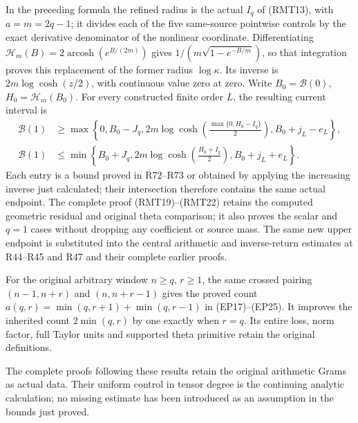 In the preceding formula the refined radius is the actual
\(I_q\) of (RMT13), with \(a=m=2q-1\); it divides each
of the five same-source pointwise controls by the exact
derivative denominator of the nonlinear coordinate.
Differentiating
\(\mathscr H_m(B)=2\operatorname{arcosh}(e^{B/(2m)})\)
gives \(1/(m\sqrt{1-e^{-B/m}})\), so that integration
proves this replacement of the former radius
\(\log\kappa\).  Its inverse is
\(2m\log\cosh(z/2)\), with continuous value zero at zero.
Write \(B_0=\mathcal B(0)\), \(H_0=\mathscr H_m(B_0)\).
For every constructed finite order \(L\), the resulting
current interval is
\[
 \begin{split}
 \mathcal B(1)&\geq
 \max\left\{0,B_0-J_q,
   2m\log\cosh\left(\frac{\max\{0,H_0-I_q\}}2\right),
   B_0+j_L-e_L\right\},\\
 \mathcal B(1)&\leq
 \min\left\{B_0+J_q,
   2m\log\cosh\left(\frac{H_0+I_q}2\right),
   B_0+j_L+e_L\right\}.
 \end{split}
\]
Each entry is a bound proved in R72--R73 or obtained
by applying the increasing inverse just calculated;
their intersection therefore contains the same actual
endpoint.  The complete proof (RMT19)--(RMT22) retains
the computed geometric residual and original theta
comparison; it also proves the scalar and \(q=1\)
cases without dropping any coefficient or source mass.
The same new upper endpoint is substituted into the
central arithmetic and inverse-return estimates at
R44--R45 and R47 and their complete earlier proofs.

For the original arbitrary window $n\ge q$, $r\ge1$, the same
crossed pairing $(n-1,n+r)$ and $(n,n+r-1)$ gives the proved count
$a(q,r)=\min(q,r+1)+\min(q,r-1)$ in (EP17)--(EP25).
It improves the inherited count $2\min(q,r)$ by one exactly
when $r=q$. Its entire loss, norm factor, full Taylor units
and supported theta primitive retain the original definitions.

The complete proofs following these results retain the
original arithmetic Grams as actual data. Their uniform
control in tensor degree is the continuing analytic
calculation; no missing estimate has been introduced as
an assumption in the bounds just proved.
